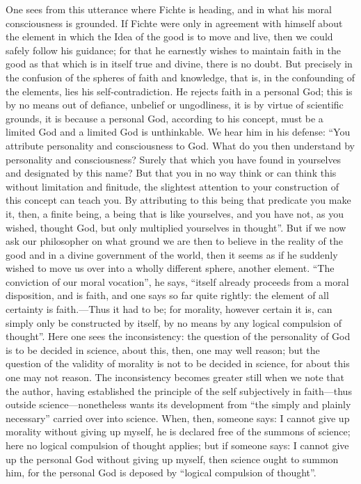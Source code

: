 \documentclass[12pt,a4paper,openany]{book}
\newcommand{\opage}[1]{\marginnote{\footnotesize\textit{[#1]}}}
\begin{document}
One sees from this utterance where Fichte is heading,
and in what his moral consciousness is grounded.
If Fichte were only in agreement with himself about the
element in which the Idea of the good is to move and live, then
we could safely follow his guidance; for that he
earnestly wishes to maintain faith in the good as that which is in itself
true and divine, there is no doubt. But
precisely in the confusion of the spheres of faith and knowledge,
that is, in the confounding of the elements, lies his self-contradiction.
He rejects faith in a personal God;
this is by no means out of defiance, unbelief or ungodliness,
it is by virtue of scientific grounds, it is because a
personal God, according to his concept, must be a limited
God and a limited God is unthinkable. We
hear him in his defense: ``You attribute personality
and consciousness to God. What do you then understand by personality and
consciousness? Surely that which you have found in yourselves
\setcounter{footnote}{0}%
\opage{528}and designated by this name? But that you in no
way think or can think this without limitation
and finitude, the slightest attention
to your construction of this concept can
teach you. By attributing to this being that predicate
you make it, then, a finite being, a being that is
like yourselves, and you have not, as you wished, thought God, but
only multiplied yourselves in thought''. But
if we now ask our philosopher on what ground we are then to
believe in the reality of the good and in a divine
government of the world, then it seems as if he suddenly
wished to move us over into a wholly different sphere, another
element. ``The conviction of our moral vocation'',
he says, ``itself already proceeds from a moral
disposition, and is faith, and one says so far quite
rightly: the element of all certainty is faith.---Thus
it had to be; for morality, however certain it is,
can simply only be constructed by itself, by no means
by any logical compulsion of thought''. Here one sees the inconsistency:
the question of the personality of God is to be decided
in science, about this, then, one may well reason;
but the question of the validity of morality
is not to be decided in science, for about this one may
not reason. The inconsistency becomes greater still when
we note that the author, having established
the principle of the self subjectively in faith---thus outside
science---nonetheless wants its development
from ``the simply and plainly necessary'' carried over into science.
When, then, someone says: I cannot give up
morality without giving up myself, he is declared
free of the summons of science; here no
logical compulsion of thought applies; but if someone says: I cannot
\setcounter{footnote}{0}%
\opage{529}give up the personal God without giving up myself,
then science ought to summon him, for the personal God
is deposed by ``logical compulsion of thought''.
\end{document}
